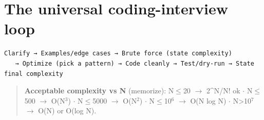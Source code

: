 \documentclass[11pt]{article}
\begin{document}
\section{The universal coding-interview loop}\label{the-universal-coding-interview-loop}

\setcodelang{}

\begin{verbatim}
Clarify → Examples/edge cases → Brute force (state complexity)
   → Optimize (pick a pattern) → Code cleanly → Test/dry-run → State final complexity
\end{verbatim}

\begin{quote}
\textbf{Acceptable complexity vs N} (memorize): N\(\leq\)20 \(\rightarrow\) 2\^{}N/N! ok \(\cdot\) N\(\leq\)500 \(\rightarrow\) O(N\(^3\)) \(\cdot\) N\(\leq\)5000 \(\rightarrow\) O(N\(^2\)) \(\cdot\) N\(\leq\)10\(^6\) \(\rightarrow\) O(N log N) \(\cdot\) N\textgreater10\(^7\) \(\rightarrow\) O(N) or O(log N).
\end{quote}
\end{document}
